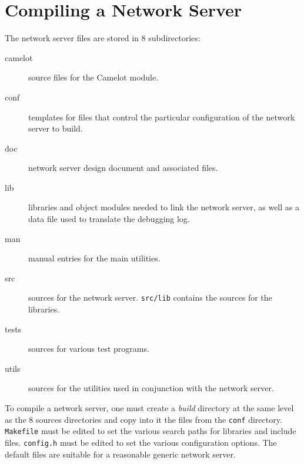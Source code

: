 \appendix

\section{Compiling a Network Server}
The network server files are stored in 8 subdirectories:
\begin{description}
\item[camelot] source files for the Camelot module.
\item[conf] templates for files that control the particular
configuration of the network server to build.
\item[doc] network server design document and associated files.
\item[lib] libraries and object modules needed to link the
network server, as well as a data file used to translate the debugging log.
\item[man] manual entries for the main utilities.
\item[src] sources for the network server. \verb"src/lib" contains the
sources for the libraries.
\item[tests] sources for various test programs.
\item[utils] sources for the utilities used in conjunction
with the network server.
\end{description}

To compile a network server, one must create a {\it build} directory
at the same level as the 8 sources directories and copy into it the
files from the \verb"conf" directory. \verb"Makefile" must be edited
to set the various search paths for libraries and include files.
\verb"config.h" must be edited to set the various configuration
options. The default files are suitable for a reasonable generic
network server.

